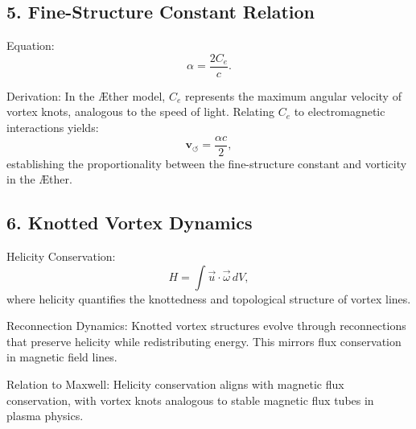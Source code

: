 \documentclass[a4paper,10pt]{article}
\begin{document}
        \subsection*{5. Fine-Structure Constant Relation}
        Equation:
        \begin{equation*}
            \alpha = \frac{2C_e}{c}.
        \end{equation*}

        Derivation:
        In the Æther model, $C_e$ represents the maximum angular velocity of vortex knots, analogous to the speed of light. Relating $C_e$ to electromagnetic interactions yields:
        \begin{equation*}
            \mathbf{v}_{\scriptscriptstyle\boldsymbol{\circlearrowleft}} = \frac{\alpha c}{2},
        \end{equation*}
        establishing the proportionality between the fine-structure constant and vorticity in the Æther.

        \subsection*{6. Knotted Vortex Dynamics}
        Helicity Conservation:
        \begin{equation*}
            H = \int \vec{u} \cdot \vec{\omega} \, dV,
        \end{equation*}
        where helicity quantifies the knottedness and topological structure of vortex lines.

        Reconnection Dynamics:
        Knotted vortex structures evolve through reconnections that preserve helicity while redistributing energy. This mirrors flux conservation in magnetic field lines.

        Relation to Maxwell:
        Helicity conservation aligns with magnetic flux conservation, with vortex knots analogous to stable magnetic flux tubes in plasma physics.
\end{document}
